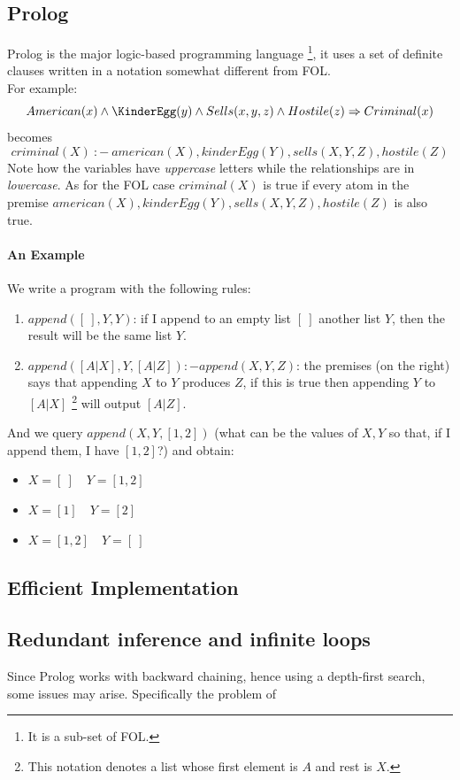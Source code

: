 \documentclass[10pt,a4paper]{article}
\begin{document}
\begin{itemize}
\section{Prolog}
Prolog is the major logic-based programming language \footnote{It is a sub-set of FOL.}, it uses a set of definite clauses written in a notation somewhat different from FOL.\\ 
For example:
\[American(x)\wedge \KinderEgg(y)\wedge Sells(x,y,z)\wedge Hostile(z)\Rightarrow Criminal(x)\]
becomes
\[criminal(X)\ :-\ american(X), kinderEgg(Y), sells(X,Y,Z), hostile(Z)\]
Note how the variables have \textit{uppercase} letters while the relationships are in \textit{lowercase}. As for the FOL case $criminal(X)$ is true if every atom in the premise $american(X), kinderEgg(Y), sells(X,Y,Z), hostile(Z)$ is also true.\\

\paragraph{An Example}
We write a program with the following rules:
\begin{enumerate}
\item $append([\ ],Y,Y)$: if I append to an empty list $[\ ]$ another list $Y$, then the result will be the same list $Y$.
\item $append([A|X],Y,[A|Z]) :- append(X,Y,Z)$: the premises (on the right) says that appending $X$ to $Y$ produces $Z$, if this is true then appending $Y$ to $[A|X]$ \footnote{This notation denotes a list whose first element is $A$ and rest is $X$.} will output $[A|Z]$. 
\end{enumerate}
And we query $append(X,Y,[1,2])$ (what can be the values of $X,Y$ so that, if I append them, I have $[1,2]$?) and obtain:
\begin{itemize}
\item $X=[\ ]\quad Y=[1,2]$
\item $X=[1]\quad Y=[2]$
\item $X=[1,2]\quad Y=[\ ]$
\end{itemize}


\subsection{Efficient Implementation}

\subsection{Redundant inference and infinite loops}
Since Prolog works with backward chaining, hence using a depth-first search, some issues may arise. Specifically the problem of 

\end{itemize} 
\end{document}
